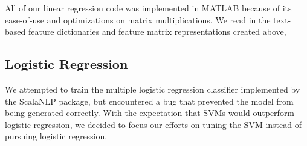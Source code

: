 \documentclass[preprint]{acm_proc_article-sp}
\begin{document}
All of our linear regression code was implemented in MATLAB because of its ease-of-use 
and optimizations on matrix multiplications. We read in the text-based feature dictionaries and feature matrix
representations created above, 


%
%
%




\subsection{Logistic Regression}

We attempted to train the multiple logistic regression classifier implemented by the ScalaNLP package, but encountered a bug that prevented the model from being generated correctly. With the expectation that SVMs would outperform logistic regression, we decided to focus our efforts on tuning the SVM instead of pursuing logistic regression. 
\end{document}

